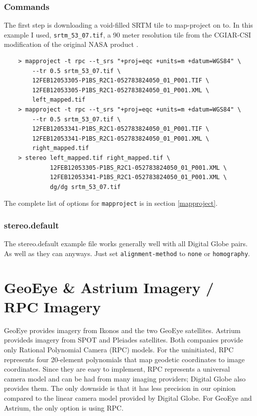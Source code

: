 \subsubsection*{Commands}

The first step is downloading a void-filled SRTM tile to map-project
on to. In this example I used, \texttt{srtm\_53\_07.tif}, a 90 meter
resolution tile from the CGIAR-CSI modification of the original NASA
product \cite{cgiar:srtm90m}.

\begin{verbatim}
    > mapproject -t rpc --t_srs "+proj=eqc +units=m +datum=WGS84" \
        --tr 0.5 srtm_53_07.tif \
        12FEB12053305-P1BS_R2C1-052783824050_01_P001.TIF \
        12FEB12053305-P1BS_R2C1-052783824050_01_P001.XML \
        left_mapped.tif
    > mapproject -t rpc --t_srs "+proj=eqc +units=m +datum=WGS84" \
        --tr 0.5 srtm_53_07.tif \
        12FEB12053341-P1BS_R2C1-052783824050_01_P001.TIF \
        12FEB12053341-P1BS_R2C1-052783824050_01_P001.XML \
        right_mapped.tif
    > stereo left_mapped.tif right_mapped.tif \
             12FEB12053305-P1BS_R2C1-052783824050_01_P001.XML \
             12FEB12053341-P1BS_R2C1-052783824050_01_P001.XML \
             dg/dg srtm_53_07.tif
\end{verbatim}

The complete list of options for \texttt{mapproject} is in section
\ref{mapproject}.

\subsubsection*{stereo.default}

The stereo.default example file works generally well with all Digital
Globe pairs. As well as they can anyways. Just set
\texttt{alignment-method} to \texttt{none} or \texttt{homography}.

\newpage
\section{GeoEye \& Astrium Imagery / RPC Imagery}
\label{rpc}

GeoEye provides imagery from Ikonos and the two GeoEye
satellites. Astrium provideds imagery from SPOT and Pleiades
satellites. Both companies provide only Rational Polynomial Camera
(RPC) models. For the uninitiated, RPC represents four 20-element
polynomials that map geodetic coordinates to image coordinates. Since
they are easy to implement, RPC represents a universal camera model
and can be had from many imaging providers; Digital Globe also
provides them. The only downside is that it has less precision in our
opinion compared to the linear camera model provided by Digital
Globe. For GeoEye and Astrium, the only option is using RPC.

